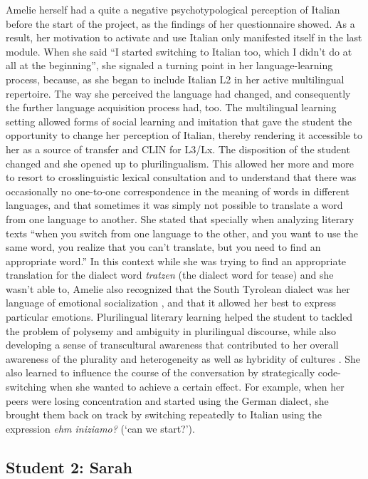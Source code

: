 \documentclass[output=paper]{../langscibook}
\begin{document}
Amelie herself had a quite a negative psychotypological perception of Italian before the start of the project, as the findings of her questionnaire showed. As a result, her motivation to activate and use Italian only manifested itself in the last module. When she said “I started switching to Italian too, which I didn’t do at all at the beginning”, she signaled a turning point in her language-learning process, because, as she began to include Italian L2 in her active multilingual repertoire. The way she perceived the language had changed, and consequently the further language acquisition process had, too. The multilingual learning setting allowed forms of social learning and imitation that gave the student the opportunity to change her perception of Italian, thereby rendering it accessible to her as a source of transfer and CLIN for L3/Lx. The disposition of the student changed and she opened up to plurilingualism. This allowed her more and more to resort to crosslinguistic lexical consultation and to understand that there was occasionally no one-to-one correspondence in the meaning of words in different languages, and that sometimes it was simply not possible to translate a word from one language to another. She stated that specially when analyzing literary texts “when you switch from one language to the other, and you want to use the same word, you realize that you can’t translate, but you need to find an appropriate word.” In this context while she was trying to find an appropriate translation for the dialect word \emph{tratzen} (the dialect word for tease) and she wasn’t able to, Amelie also recognized that the South Tyrolean dialect was her language of emotional socialization \citep{Pavlenko2011}, and that it allowed her best to express particular emotions. Plurilingual literary learning helped the student to tackled the problem of polysemy and ambiguity in plurilingual discourse, while also developing a sense of transcultural awareness that contributed to her overall awareness of the plurality and heterogeneity as well as hybridity of cultures \citep[201]{Hufeisen2010}. She also learned to influence the course of the conversation by strategically code-switching when she wanted to achieve a certain effect. For example, when her peers were losing concentration and started using the German dialect, she brought them back on track by switching repeatedly to Italian using the expression \emph{ehm iniziamo?} (`can we start?').

\subsection{Student 2: Sarah}
\end{document}
